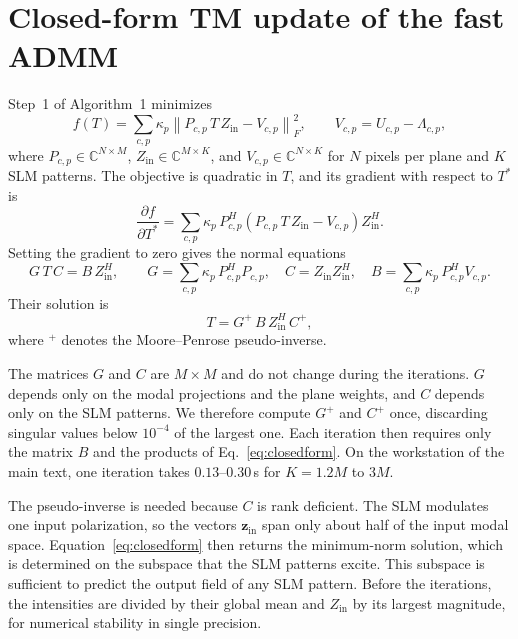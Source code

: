 \documentclass{article}
\begin{document}
\section{Closed-form TM update of the fast ADMM}
\label{sec:tmupdate}
Step~1 of Algorithm~1 minimizes
\begin{equation}
\label{eq:objective}
f(T)=\sum_{c,p}\kappa_p\left\|P_{c,p}\,T\,Z_{\mathrm{in}}-V_{c,p}\right\|_F^2,\qquad V_{c,p}=U_{c,p}-\Lambda_{c,p},
\end{equation}
where $P_{c,p}\in\mathbb{C}^{N\times M}$, $Z_{\mathrm{in}}\in\mathbb{C}^{M\times K}$, and $V_{c,p}\in\mathbb{C}^{N\times K}$ for $N$ pixels per plane and $K$ SLM patterns.
The objective is quadratic in $T$, and its gradient with respect to $T^*$ is
\begin{equation}
\frac{\partial f}{\partial T^*}=\sum_{c,p}\kappa_p\,P_{c,p}^{H}\left(P_{c,p}\,T\,Z_{\mathrm{in}}-V_{c,p}\right)Z_{\mathrm{in}}^{H}.
\end{equation}
Setting the gradient to zero gives the normal equations
\begin{equation}
\label{eq:normal}
G\,T\,C=B\,Z_{\mathrm{in}}^{H},\qquad
G=\sum_{c,p}\kappa_p\,P_{c,p}^{H}P_{c,p},\quad
C=Z_{\mathrm{in}}Z_{\mathrm{in}}^{H},\quad
B=\sum_{c,p}\kappa_p\,P_{c,p}^{H}V_{c,p}.
\end{equation}
Their solution is
\begin{equation}
\label{eq:closedform}
T=G^{+}\,B\,Z_{\mathrm{in}}^{H}\,C^{+},
\end{equation}
where $^{+}$ denotes the Moore--Penrose pseudo-inverse.

The matrices $G$ and $C$ are $M\times M$ and do not change during the iterations.
$G$ depends only on the modal projections and the plane weights, and $C$ depends only on the SLM patterns.
We therefore compute $G^{+}$ and $C^{+}$ once, discarding singular values below $10^{-4}$ of the largest one.
Each iteration then requires only the matrix $B$ and the products of Eq.~\eqref{eq:closedform}.
On the workstation of the main text, one iteration takes $0.13$--$0.30$\,s for $K=1.2M$ to $3M$.

The pseudo-inverse is needed because $C$ is rank deficient.
The SLM modulates one input polarization, so the vectors $\mathbf{z}_{\mathrm{in}}$ span only about half of the input modal space.
Equation~\eqref{eq:closedform} then returns the minimum-norm solution, which is determined on the subspace that the SLM patterns excite.
This subspace is sufficient to predict the output field of any SLM pattern.
Before the iterations, the intensities are divided by their global mean and $Z_{\mathrm{in}}$ by its largest magnitude, for numerical stability in single precision.
\end{document}

